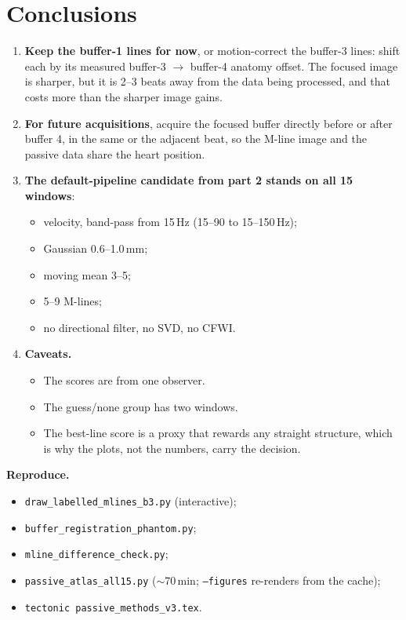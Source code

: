 \documentclass[10pt]{article}
\begin{document}
\section{Conclusions}
\begin{enumerate}
  \item \textbf{Keep the buffer-1 lines for now}, or motion-correct the buffer-3 lines: shift
    each by its measured buffer-3 $\rightarrow$ buffer-4 anatomy offset. The focused image is
    sharper, but it is 2--3 beats away from the data being processed, and that costs more than
    the sharper image gains.
  \item \textbf{For future acquisitions}, acquire the focused buffer directly before or after
    buffer 4, in the same or the adjacent beat, so the M-line image and the passive data share
    the heart position.
  \item \textbf{The default-pipeline candidate from part 2 stands on all 15 windows}:
    \begin{itemize}
      \item velocity, band-pass from 15\,Hz (15--90 to 15--150\,Hz);
      \item Gaussian 0.6--1.0\,mm;
      \item moving mean 3--5;
      \item 5--9 M-lines;
      \item no directional filter, no SVD, no CFWI.
    \end{itemize}
  \item \textbf{Caveats.}
    \begin{itemize}
      \item The scores are from one observer.
      \item The guess/none group has two windows.
      \item The best-line score is a proxy that rewards any straight structure, which is why the
        plots, not the numbers, carry the decision.
    \end{itemize}
\end{enumerate}

\textbf{Reproduce.}
\begin{itemize}
  \item \texttt{draw\_labelled\_mlines\_b3.py} (interactive);
  \item \texttt{buffer\_registration\_phantom.py};
  \item \texttt{mline\_difference\_check.py};
  \item \texttt{passive\_atlas\_all15.py} ($\sim$70\,min; \texttt{--figures} re-renders from
    the cache);
  \item \texttt{tectonic passive\_methods\_v3.tex}.
\end{itemize}
\end{document}
